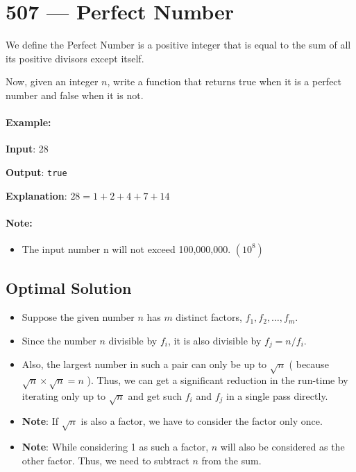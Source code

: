 \section{507 --- Perfect Number}
We define the Perfect Number is a positive integer that is equal to the sum of all its positive divisors except itself.

Now, given an integer $n$, write a function that returns true when it is a perfect number and false when it is not.

\paragraph{Example:}

\begin{flushleft}
\textbf{Input}: 28

\textbf{Output}: \texttt{true}

\textbf{Explanation}: $28 = 1 + 2 + 4 + 7 + 14$
\end{flushleft}

\paragraph{Note:} 
\begin{itemize}
\item The input number n will not exceed 100,000,000. $(10^8)$
\end{itemize}

\subsection{Optimal Solution}
\begin{itemize}
\item Suppose the given number $n$ has $m$ distinct factors, $f_1, f_2, \ldots, f_m$. 
\item Since the number $n$ divisible by $f_i$, it is also divisible by $f_j=n/f_i$.
\item Also, the largest number in such a pair can only be up to $\sqrt{n}$ ( because $\sqrt{n} \times \sqrt{n}=n$ ). Thus, we can get a significant reduction in the run-time by iterating only up to $\sqrt{n}$ and get such $f_i$ and $f_j$ in a single pass directly.
\item \textbf{Note}: If $\sqrt{n}$ is also a factor, we have to consider the factor only once. 
\item \textbf{Note}: While considering 1 as such a factor, $n$ will also be considered as the other factor. Thus, we need to subtract $n$ from the sum.
\end{itemize}

